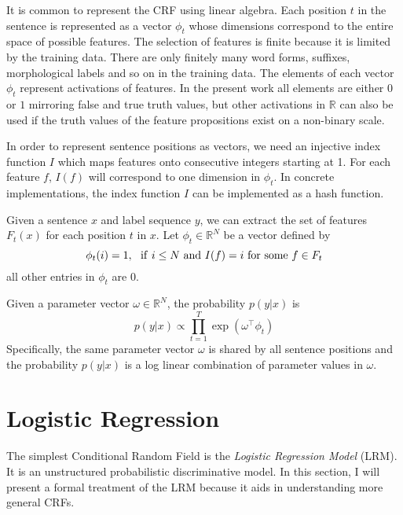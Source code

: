 It is common to represent the CRF using linear algebra. Each position
$t$ in the sentence is represented as a vector $\phi_t$ whose
dimensions correspond to the entire space of possible features. The
selection of features is finite because it is limited by the training
data. There are only finitely many word forms, suffixes, morphological
labels and so on in the training data. The elements of each vector
$\phi_t$ represent activations of features. In the present work all
elements are either $0$ or $1$ mirroring false and true truth values,
but other activations in $\mathbb{R}$ can also be used if the truth
values of the feature propositions exist on a non-binary scale.

In order to represent sentence positions as vectors, we need an
injective index function $I$ which maps features onto consecutive
integers starting at 1. For each feature $f$, $I(f)$ will correspond
to one dimension in $\phi_t$. In concrete implementations, the index
function $I$ can be implemented as a hash function.
 
Given a sentence $x$ and label sequence $y$, we can extract the set of features
$F_t(x)$ for each position $t$ in $x$. Let $\phi_t \in \mathbb{R}^N$ be a vector defined by
$$\phi_t(i) = 1,\ {\rm\ if}\ i \le N\ {\rm and}\ I(f) = i\ {\rm for\ some\ }f\in F_t$$
all other entries in $\phi_t$ are $0$. 

Given a parameter vector $\omega \in \mathbb{R}^N$, the probability $p(y|x)$ is
$$p(y|x) \propto \prod_{t = 1}^T \exp(\omega^\top \phi_t)$$
Specifically, the same parameter vector $\omega$ is shared by all
sentence positions and the probability $p(y|x)$ is a log linear
combination of parameter values in $\omega$.

\cite{Lafferty2001}
\section{Logistic Regression}

The simplest Conditional Random Field is the {\it Logistic Regression
  Model} (LRM). It is an unstructured probabilistic discriminative
model. In this section, I will present a formal treatment of the
LRM because it aids in understanding more general
CRFs.

